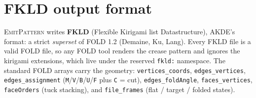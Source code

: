 \documentclass[11pt]{article}
\begin{document}
\section{FKLD output format}\label{sec:fold}
\textsc{EmitPattern} writes \textbf{FKLD} (Flexible Kirigami list
Datastructure), AKDE's format: a strict \emph{superset} of FOLD 1.2 (Demaine,
Ku, Lang). Every FKLD file is a valid FOLD file, so any FOLD tool renders the
crease pattern and ignores the kirigami extensions, which live under the
reserved \texttt{fkld:} namespace. The standard FOLD arrays carry the geometry:
\texttt{vertices\_coords}, \texttt{edges\_vertices}, \texttt{edges\_assignment}
(\texttt{M}/\texttt{V}/\texttt{B}/\texttt{U}/\texttt{F} plus \texttt{C} = cut),
\texttt{edges\_foldAngle}, \texttt{faces\_vertices}, \texttt{faceOrders} (tuck
stacking), and \texttt{file\_frames} (flat / target / folded states).
\end{document}
